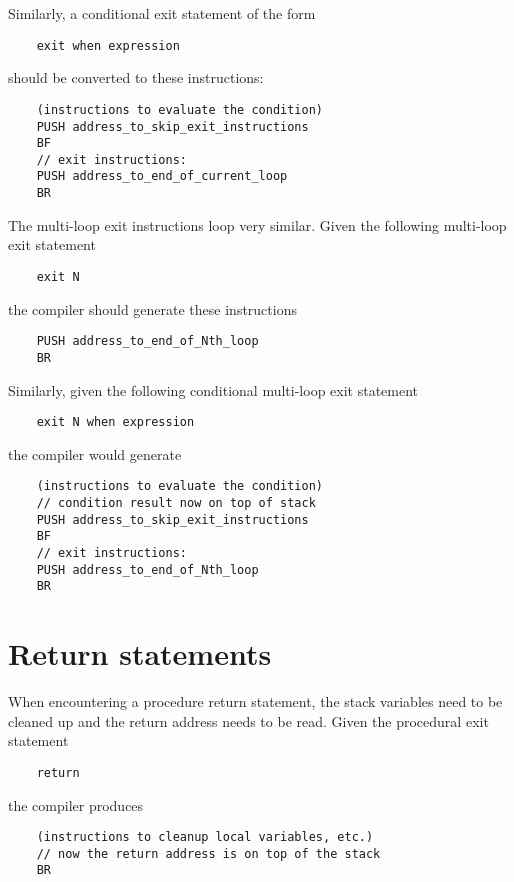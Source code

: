 \documentclass{article}
\begin{document}
\noindent
Similarly, a conditional exit statement of the form
\begin{lstlisting}
    exit when expression
\end{lstlisting}
should be converted to these instructions:
\begin{lstlisting}
    (instructions to evaluate the condition)
    PUSH address_to_skip_exit_instructions
    BF
    // exit instructions:
    PUSH address_to_end_of_current_loop
    BR
\end{lstlisting}

\noindent
The multi-loop exit instructions loop very similar.
Given the following multi-loop exit statement
\begin{lstlisting}
    exit N
\end{lstlisting}
the compiler should generate these instructions
\begin{lstlisting}
    PUSH address_to_end_of_Nth_loop
    BR
\end{lstlisting}

Similarly, given the following conditional multi-loop exit statement
\begin{lstlisting}
    exit N when expression
\end{lstlisting}
the compiler would generate
\begin{lstlisting}
    (instructions to evaluate the condition)
    // condition result now on top of stack
    PUSH address_to_skip_exit_instructions
    BF
    // exit instructions:
    PUSH address_to_end_of_Nth_loop
    BR
\end{lstlisting}

\section{Return statements}
When encountering a procedure return statement, the stack variables need to be cleaned up and the return address needs to be read.
\newline
Given the procedural exit statement
\begin{lstlisting}
    return
\end{lstlisting}
the compiler produces
\begin{lstlisting}
    (instructions to cleanup local variables, etc.)
    // now the return address is on top of the stack
    BR
\end{lstlisting}
\end{document}
